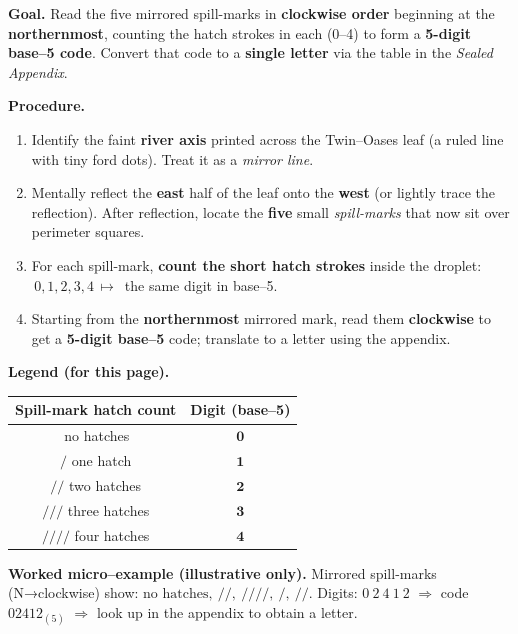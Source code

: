 \documentclass[11pt]{article}
\begin{document}
\begin{itemize}
\medskip
\noindent\textbf{Goal.} Read the five mirrored spill-marks in \textbf{clockwise order} beginning at the \textbf{northernmost}, counting the hatch strokes in each (0–4) to form a \textbf{5-digit base–5 code}. Convert that code to a \textbf{single letter} via the table in the \emph{Sealed Appendix}.

\medskip
\noindent\textbf{Procedure.}
\begin{enumerate}\setlength\itemsep{0.2em}
  \item Identify the faint \textbf{river axis} printed across the Twin–Oases leaf (a ruled line with tiny ford dots). Treat it as a \emph{mirror line}.
  \item Mentally reflect the \textbf{east} half of the leaf onto the \textbf{west} (or lightly trace the reflection). After reflection, locate the \textbf{five} small \emph{spill-marks} that now sit over perimeter squares.
  \item For each spill-mark, \textbf{count the short hatch strokes} inside the droplet: \(\,0,1,2,3,4\,\mapsto\,\) the same digit in base–5.
  \item Starting from the \textbf{northernmost} mirrored mark, read them \textbf{clockwise} to get a \textbf{5-digit base–5} code; translate to a letter using the appendix.
\end{enumerate}

\medskip
\noindent\textbf{Legend (for this page).}
\begin{center}
\begin{tabular}{c|c}
\textbf{Spill-mark hatch count} & \textbf{Digit (base–5)} \\
\hline
\(\,\)no hatches & \(\mathbf{0}\) \\
\(/\) one hatch & \(\mathbf{1}\) \\
\(/\!\!/\) two hatches & \(\mathbf{2}\) \\
\(/\!\!/\!\!/\) three hatches & \(\mathbf{3}\) \\
\(/\!\!/\!\!/\!\!/\) four hatches & \(\mathbf{4}\) \\
\end{tabular}
\end{center}

\medskip
\noindent\textbf{Worked micro–example (illustrative only).}  
Mirrored spill-marks (N→clockwise) show: \(\text{no hatches},\ /\!\!/,\ /\!\!/\!\!/\!\!/,\ /,\ /\!\!/\).  
Digits: \(0\ 2\ 4\ 1\ 2\) \(\Rightarrow\) code \(02412_{(5)}\) \(\Rightarrow\) look up in the appendix to obtain a letter.


\end{itemize}
\end{document}
